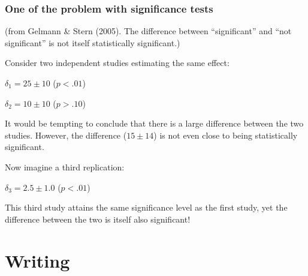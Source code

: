 \documentclass{beamer}
\begin{document}
\begin{frame}
\frametitle{One of the problem with significance tests}

{\footnotesize (from Gelmann \& Stern (2005). The difference between ``significant'' and ``not significant'' is not itself statistically significant.)}

\vspace*{12pt}

Consider two independent studies estimating the same effect:

\quad  $\delta_1 = 25 \pm 10$ ($p<.01$)

\quad  $\delta_2 = 10 \pm 10$ ($p>.10$)

\vspace*{6pt}

  It would be tempting to conclude that there is a large difference
  between the two studies. However, the difference ($15 \pm 14$) is not
  even close to being statistically significant.

\vspace*{6pt}

\pause
  Now imagine a third replication:

\quad  $\delta_3 = 2.5 \pm 1.0$ ($p<.01$)

  This third study attains the same significance level as the first
  study, yet the difference between the two is itself also
  significant!




\end{frame}




\section{Writing}
\end{document}

